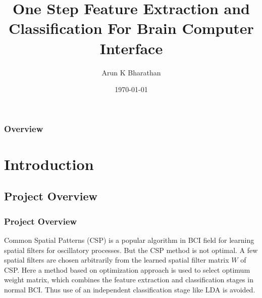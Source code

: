 \documentclass[11pt]{beamer}
\title[Short title]{One Step Feature Extraction and Classification For Brain Computer Interface} %
\author{Arun K Bharathan} %
\institute[NSSCE] %
{
NSS College of Engineering, Palakkad\\ %
\medskip
\textit{arunkbharathan@gmail.com} %
}
\date{\today} %
\begin{document}
\begin{frame}
\titlepage %
\end{frame}

\begin{frame}
\frametitle{Overview} %
\tableofcontents %
\end{frame}


\section{Introduction} %
\subsection{Project Overview} 
\begin{frame}%
\frametitle{Project Overview}
Common Spatial Patterns (CSP) is a popular algorithm in BCI field for learning spatial filters for oscillatory processes. But the CSP method is not optimal. A few spatial filters are chosen arbitrarily from the learned spatial filter matrix $W$ of CSP. Here a method based on optimization approach is used to select optimum weight matrix, which combines the feature extraction and classification stages in normal BCI. Thus use of an independent classification stage like LDA is avoided.
\end{frame}
\end{document}
